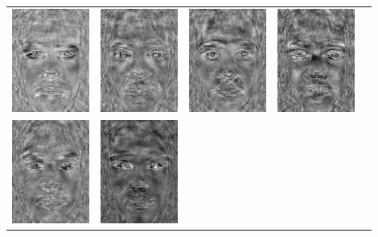 \documentclass[12pt]{article}
\begin{document}
\begin{enumerate}
\begin{enumerate}
\begin{table}[H]
\begin{tabular}{ccccc}
\includegraphics[width=1in]{lda/6}&\includegraphics[width=1in]{lda/7}&
\includegraphics[width=1in]{lda/8}&\includegraphics[width=1in]{lda/9}\\
\includegraphics[width=1in]{lda/10}&\includegraphics[width=1in]{lda/11}&

\end{tabular}
\end{table}
\end{enumerate}
\end{enumerate}
\end{document}
